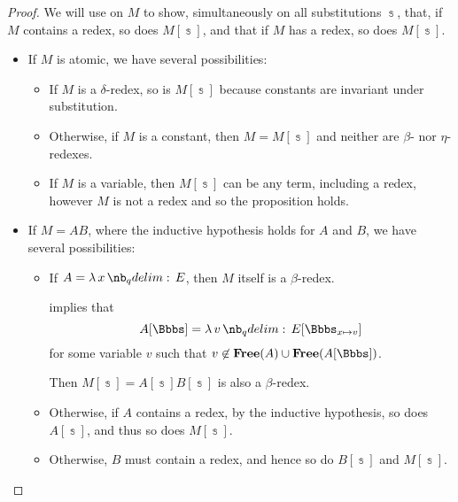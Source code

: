 \begin{proof}
   We will use  on \( M \) to show, simultaneously on all substitutions \( \Bbbs \), that, if \( M \) contains a redex, so does \( M[\Bbbs] \), and that if \( M \) has a redex, so does \( M[\Bbbs] \).

  \begin{itemize}
    \item If \( M \) is atomic, we have several possibilities:
    \begin{itemize}
      \item If \( M \) is a \( \delta \)-redex, so is \( M[\Bbbs] \) because constants are invariant under substitution.

      \item Otherwise, if \( M \) is a constant, then \( M = M[\Bbbs] \) and neither are \( \beta \)- nor \( \eta \)-redexes.

      \item If \( M \) is a variable, then \( M[\Bbbs] \) can be any term, including a redex, however \( M \) is not a redex and so the proposition holds.
    \end{itemize}

    \item If \( M = AB \), where the inductive hypothesis holds for \( A \) and \( B \), we have several possibilities:
    \begin{itemize}
      \item If \( A = \qabs x E \), then \( M \) itself is a \( \beta \)-redex.

       implies that
      \begin{equation*}
        A[\Bbbs] = \qabs v E[\Bbbs_{x \mapsto v}]
      \end{equation*}
      for some variable \( v \) such that \( v \not\in \op*{Free}(A) \cup \op*{Free}(A[\Bbbs]) \).

      Then \( M[\Bbbs] = A[\Bbbs] B[\Bbbs] \) is also a \( \beta \)-redex.

      \item Otherwise, if \( A \) contains a redex, by the inductive hypothesis, so does \( A[\Bbbs] \), and thus so does \( M[\Bbbs] \).

      \item Otherwise, \( B \) must contain a redex, and hence so do \( B[\Bbbs] \) and \( M[\Bbbs] \).
    \end{itemize}


\end{itemize}
\end{proof}
